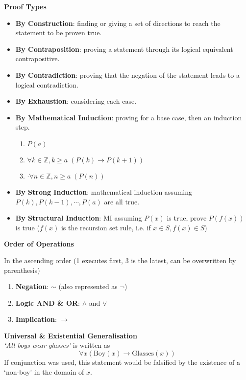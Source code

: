 \documentclass[a4paper]{article}
\newcommand{\subheading}[1]{{\scriptsize\textbf{#1}}}
\begin{document}
\begin{multicols*}{4}
\subheading{Proof Types}
\begin{itemize}[leftmargin=*] \itemsep -0.5em
  \item \textbf{By Construction}: finding or giving a set of directions to
    reach the statement to be proven true.
  \item \textbf{By Contraposition}: proving a statement through its logical
    equivalent contrapositive.
  \item \textbf{By Contradiction}: proving that the negation of the statement
    leads to a logical contradiction.
  \item \textbf{By Exhaustion}: considering each case.
  \item \textbf{By Mathematical Induction}: proving for a base case, then an
    induction step.
    \vspace{-1em} %
    \begin{enumerate} \itemsep -0.2em
      \item $P(a)$
      \item $\forall k \in \mathbb{Z}, k \geq a\;(P(k) \rightarrow P(k+1))$
      \item $\boldsymbol{\cdot} \forall n \in \mathbb{Z}, n \geq a\;(P(n))$
    \end{enumerate}
  \vspace{-0.5em}
  \item \textbf{By Strong Induction}: mathematical induction assuming $P(k),
    P(k-1), \cdots, P(a)$ are all true.
  \item \textbf{By Structural Induction}: MI assuming $P(x)$ is true, prove
    $P(f(x))$ is true ($f(x)$ is the recursion set rule, i.e. if $x \in S,
    f(x) \in S$)
\end{itemize}

\subheading{Order of Operations}

In the ascending order (1 executes first, 3 is the latest, can be overwritten by parenthesis)
\begin{enumerate}
	\item \textbf{Negation}: $\sim$ (also represented as $\neg$)
	\item \textbf{Logic AND \& OR}: $\land$ and $\lor$
	\item \textbf{Implication}: $\rightarrow$
\end{enumerate}

\subheading{Universal \& Existential Generalisation}\\
\textit{`All boys wear glasses'} is written as
  $$\forall x (\text{Boy}(x) \rightarrow \text{Glasses}(x)) $$
If conjunction was used, this statement would be falsified by the existence of a
`non-boy' in the domain of $x$.\\


\end{multicols*}
\end{document}
